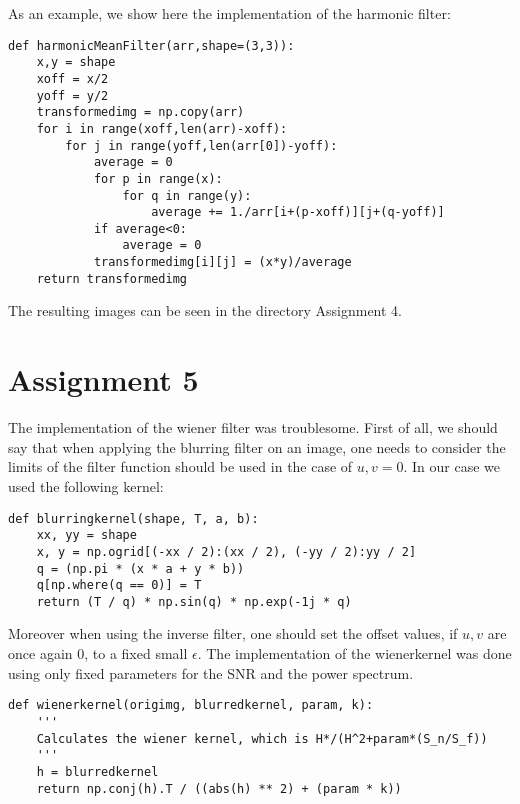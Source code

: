 As an example, we show here the implementation of the harmonic filter:

\begin{verbatim}
def harmonicMeanFilter(arr,shape=(3,3)):
    x,y = shape
    xoff = x/2
    yoff = y/2
    transformedimg = np.copy(arr)
    for i in range(xoff,len(arr)-xoff):
        for j in range(yoff,len(arr[0])-yoff):
            average = 0
            for p in range(x):
                for q in range(y):
                    average += 1./arr[i+(p-xoff)][j+(q-yoff)]
            if average<0:
                average = 0
            transformedimg[i][j] = (x*y)/average
    return transformedimg
\end{verbatim}

The resulting images can be seen in the directory Assignment 4.

\section{Assignment 5}
The implementation of the wiener filter was troublesome.
First of all, we should say that when applying the blurring filter on an image, one needs to consider the limits of the filter function should be used in the case of $u,v = 0$.
In our case we used the following kernel:
\begin{verbatim}
def blurringkernel(shape, T, a, b):
    xx, yy = shape
    x, y = np.ogrid[(-xx / 2):(xx / 2), (-yy / 2):yy / 2]
    q = (np.pi * (x * a + y * b))
    q[np.where(q == 0)] = T
    return (T / q) * np.sin(q) * np.exp(-1j * q)
\end{verbatim}

Moreover when using the inverse filter, one should set the offset values, if $u,v$ are once again $0$, to a fixed small $\epsilon$.
The implementation of the wienerkernel was done using only fixed parameters for the SNR and the power spectrum.

\begin{verbatim}
def wienerkernel(origimg, blurredkernel, param, k):
    '''
    Calculates the wiener kernel, which is H*/(H^2+param*(S_n/S_f))
    '''
    h = blurredkernel
    return np.conj(h).T / ((abs(h) ** 2) + (param * k))
\end{verbatim}

